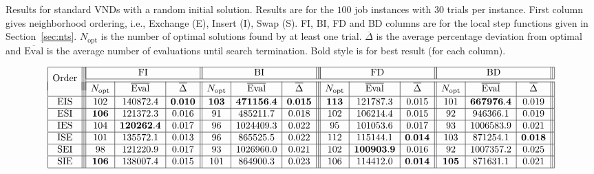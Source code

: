 \documentclass{acm_proc_article-sp}
\begin{document}
\begin{table*}[htb!]
\caption{Results for standard VNDs with a random initial solution. Results are for the $100$ job instances with $30$ trials per instance. First column gives neighborhood ordering, i.e., Exchange (E), Insert (I), Swap (S). FI, BI, FD and BD columns are for the local step functions given in Section~\ref{sec:nts}. $N_{\textrm{opt}}$ is the number of optimal solutions found by at least one trial. $\overline{\Delta}$ is the average percentage deviation from optimal and $\overline{\textrm{Eval}}$ is the average number of evaluations until search termination. Bold style is for best result (for each column).
\vspace{-3ex}
}
\label{tab:vnd}
$$
\begin{array}{|c|||c|c|c||c|c|c|||c|c|c||c|c|c|||}
\hline
\multirow{2}{*}{\textrm{Order}} & \multicolumn{3}{|c||}{\textrm{FI}} & \multicolumn{3}{|c|||}{\textrm{BI}}  & \multicolumn{3}{|c||}{\textrm{FD}} & \multicolumn{3}{|c|||}{\textrm{BD}} \\ \cline{2-13}
 \\[-9 pt] 
\cline{2-13}
& N_{\textrm{opt}} & \overline{\textrm{Eval}}  \rule[-5pt]{0pt}{15pt} & \overline{\Delta} & N_{\textrm{opt}} & \overline{\textrm{Eval}} &  \overline{\Delta} & N_{\textrm{opt}} & \overline{\textrm{Eval}}  \rule[-5pt]{0pt}{15pt} & \overline{\Delta} & N_{\textrm{opt}} & \overline{\textrm{Eval}} &  \overline{\Delta} \\ \hline

\textrm{EIS} &102 & 140872.4 & \mathbf{0.010} & \mathbf{103} & \mathbf{471156.4} & \mathbf{0.015} & \mathbf{113} & 121787.3 & 0.015 & 101 & \mathbf{667976.4} & 0.019  \\ \hline

\textrm{ESI} & \mathbf{106} & 121372.3 & 0.016 & 91 & 485211.7 & 0.018 & 102 & 106214.4 & 0.015 & 92 & 946366.1 & 0.019 \\ \hline

\textrm{IES} & 104 & \mathbf{120262.4} & 0.017 & 96 & 1024409.3 & 0.022 & 95 & 101053.6 & 0.017 & 93 & 1006583.9 & 0.021 \\ \hline

\textrm{ISE} & 101 & 135572.1 & 0.013 & 96 & 865525.5 & 0.022 & 112 & 115144.1 & \mathbf{0.014} & 103 & 871254.1 & \mathbf{0.018} \\ \hline

\textrm{SEI} & 98 & 121220.9 & 0.017 & 93 & 1026960.0 & 0.021 & 102 & \mathbf{100903.9} & 0.016 & 92 & 1007357.2 & 0.025\\ \hline

\textrm{SIE} & \mathbf{106} & 138007.4 & 0.015 & 101 & 864900.3 & 0.023  & 106 & 114412.0 & \mathbf{0.014} & \mathbf{105} & 871631.1 & 0.021 \\ \hline
\end{array}
$$
\end{table*}
\end{document}
